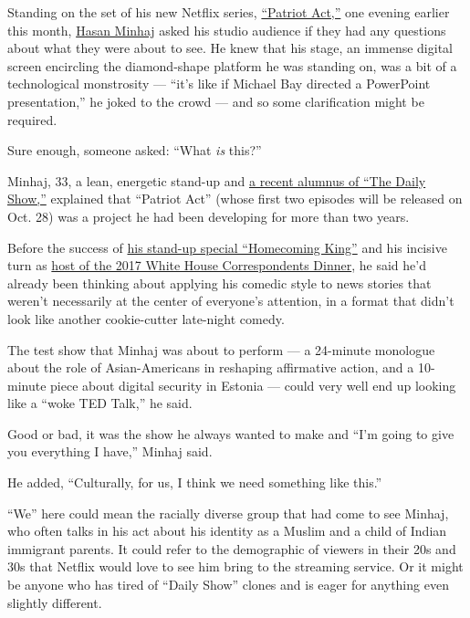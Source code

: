 Standing on the set of his new Netflix series,
\href{https://www.youtube.com/watch?v=g_6d77TABBE}{``Patriot Act,''} one
evening earlier this month,
\href{https://www.nytimes.com/2017/06/21/magazine/hasan-minhaj-thinks-comedy-is-for-weirdos.html}{Hasan
Minhaj} asked his studio audience if they had any questions about what
they were about to see. He knew that his stage, an immense digital
screen encircling the diamond-shape platform he was standing on, was a
bit of a technological monstrosity --- ``it's like if Michael Bay
directed a PowerPoint presentation,'' he joked to the crowd --- and so
some clarification might be required.

Sure enough, someone asked: ``What \emph{is} this?''

Minhaj, 33, a lean, energetic stand-up and
\href{https://www.youtube.com/watch?v=toUjuVlHi1Q}{a recent alumnus of
``The Daily Show,''} explained that ``Patriot Act'' (whose first two
episodes will be released on Oct. 28) was a project he had been
developing for more than two years.

Before the success of
\href{https://tv.avclub.com/the-daily-show-s-hasan-minhaj-crafts-a-hilarious-spell-1798191421}{his
stand-up special ``Homecoming King''} and his incisive turn as
\href{https://www.youtube.com/watch?v=Z7oG74nHSTQ}{host of the 2017
White House Correspondents Dinner}, he said he'd already been thinking
about applying his comedic style to news stories that weren't
necessarily at the center of everyone's attention, in a format that
didn't look like another cookie-cutter late-night comedy.

The test show that Minhaj was about to perform --- a 24-minute monologue
about the role of Asian-Americans in reshaping affirmative action, and a
10-minute piece about digital security in Estonia --- could very well
end up looking like a ``woke TED Talk,'' he said.

Good or bad, it was the show he always wanted to make and ``I'm going to
give you everything I have,'' Minhaj said.

He added, ``Culturally, for us, I think we need something like this.''

``We'' here could mean the racially diverse group that had come to see
Minhaj, who often talks in his act about his identity as a Muslim and a
child of Indian immigrant parents. It could refer to the demographic of
viewers in their 20s and 30s that Netflix would love to see him bring to
the streaming service. Or it might be anyone who has tired of ``Daily
Show'' clones and is eager for anything even slightly different.

